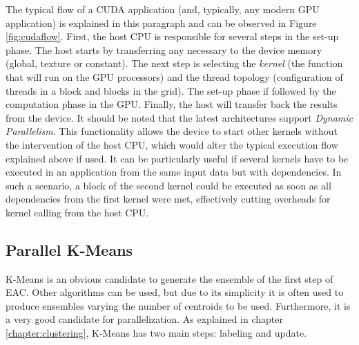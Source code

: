 The typical flow of a CUDA application (and, typically, any modern GPU application) is explained in this paragraph and can be observed in Figure \ref{fig:cudaflow}.
First, the host CPU is responsible for several steps in the set-up phase.
The host starts by transferring any necessary to the device memory (global, texture or constant).
The next step is selecting the \emph{kernel} (the function that will run on the GPU processors) and the thread topology (configuration of threads in a block and blocks in the grid).
The set-up phase if followed by the computation phase in the GPU.
Finally, the host will transfer back the results from the device.
It should be noted that the latest architectures support \emph{Dynamic Parallelism}.
This functionality allows the device to start other kernels without the intervention of the host CPU, which would alter the typical execution flow explained above if used.
It can be particularly useful if several kernels have to be executed in an application from the same input data but with dependencies.
In such a scenario, a block of the second kernel could be executed as soon as all dependencies from the first kernel were met, effectively cutting overheads for kernel calling from the host CPU.


\subsection{Parallel K-Means}

K-Means is an obvious candidate to generate the ensemble of the first step of EAC.
Other algorithms can be used, but due to its simplicity it is often used to produce ensembles varying the number of centroids to be used.
Furthermore, it is a very good candidate for parallelization.
As explained in chapter \ref{chapter:clustering}, K-Means has two main steps: labeling and update.

